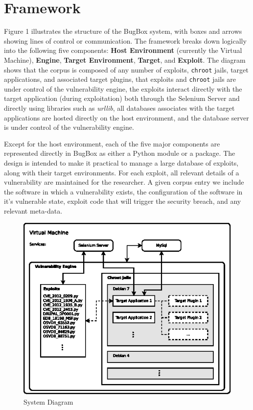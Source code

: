 \documentclass[letterpaper,twocolumn,10pt]{article}
\begin{document}
\section{Framework}

Figure 1 illustrates the structure of the BugBox system, with boxes and arrows showing lines of control or communication. The framework breaks down logically into the following five components: {\bf Host Environment} (currently the Virtual Machine), {\bf Engine}, {\bf Target Environment}, {\bf Target}, and {\bf Exploit}. The diagram shows that the corpus is composed of any number of exploits, {\tt chroot} jails, target applications, and associated target plugins, that exploits and {\tt chroot} jails are under control of the vulnerability engine, the exploits interact directly with the target application (during exploitation) both through the Selenium Server and directly using libraries such as \emph{urllib}, all databases associates with the target applications are hosted directly on the host environment, and the database server is under control of the vulnerability engine.\par
Except for the host environment, each of the five major components are represented directly in BugBox as either a Python module or a package. The design is intended to make it practical to manage a large database of exploits, along with their target environments. For each exploit, all relevant details of a vulnerability are maintained for the researcher. A given corpus entry we include the software in which a vulnerability exists, the configuration of the software in it's vulnerable state, exploit code that will trigger the security breach, and any relevant meta-data.\par

\begin{figure}[!tp]
\begin{center}
\includegraphics[scale=1.17]{system_diagram.eps}
\end{center}
\caption{System Diagram}
\end{figure}
\end{document}
